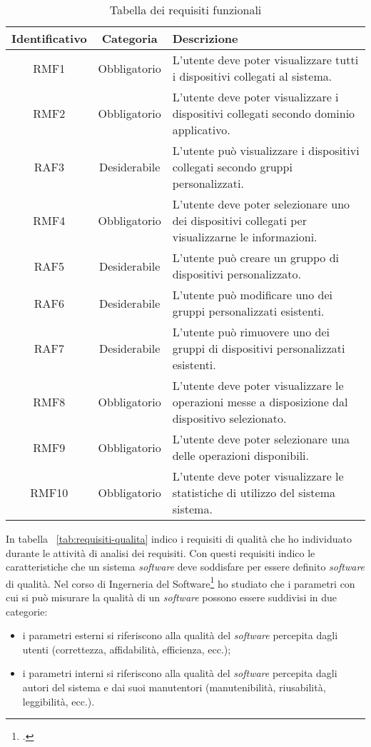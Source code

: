 \begin{table}[H]
\caption{Tabella dei requisiti funzionali}
\label{tab:requisiti-funzionali}
\begin{tabularx}{\linewidth}{|c|c|X|}
\hline
\textbf{Identificativo} & \textbf{Categoria} & \textbf{Descrizione} \\
\hline
RMF1 & Obbligatorio & L'utente deve poter visualizzare tutti i dispositivi collegati al sistema. \\
\hline
RMF2 & Obbligatorio & L'utente deve poter visualizzare i dispositivi collegati secondo dominio applicativo. \\
\hline
RAF3 & Desiderabile & L'utente può visualizzare i dispositivi collegati secondo gruppi personalizzati. \\
\hline
RMF4 & Obbligatorio & L'utente deve poter selezionare uno dei dispositivi collegati per visualizzarne le informazioni. \\
\hline
RAF5 & Desiderabile & L'utente può creare un gruppo di dispositivi personalizzato. \\
\hline
RAF6 & Desiderabile & L'utente può modificare uno dei gruppi personalizzati esistenti. \\
\hline
RAF7 & Desiderabile & L'utente può rimuovere uno dei gruppi di dispositivi personalizzati esistenti. \\
\hline
RMF8 & Obbligatorio & L'utente deve poter visualizzare le operazioni messe a disposizione dal dispositivo selezionato. \\
\hline
RMF9 & Obbligatorio & L'utente deve poter selezionare una delle operazioni disponibili. \\
\hline
RMF10 & Obbligatorio & L'utente deve poter visualizzare le statistiche di utilizzo del sistema sistema. \\
\hline
\end{tabularx}
\end{table}

In tabella ~\ref{tab:requisiti-qualita} indico i requisiti di qualità che ho individuato durante le attività di analisi dei requisiti. Con questi requisiti indico le caratteristiche che un sistema \emph{software} deve soddisfare per essere definito \emph{software} di qualità. Nel corso di Ingerneria del Software\footcite{swe-req-qual} ho studiato che i parametri con cui si può misurare la qualità di un \emph{software} possono essere suddivisi in due categorie:
\begin{itemize}
  \item i parametri esterni si riferiscono alla qualità del \emph{software} percepita dagli utenti (correttezza, affidabilità, efficienza, ecc.);
  \item i parametri interni si riferiscono alla qualità del \emph{software} percepita dagli autori del sistema e dai suoi manutentori (manutenibilità, riusabilità, leggibilità, ecc.).
\end{itemize}

